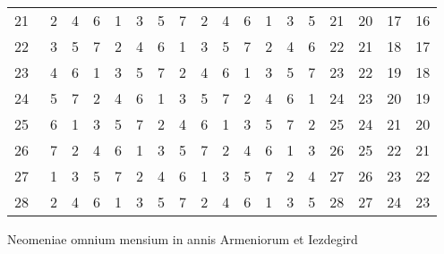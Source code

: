 \begin{tabnums}
\begin{tabular}[c]{@{} c  l l l l l l l l l l l l l  c c c c @{}}
21~  & 2 & 4 & 6 & 1 & 3 & 5 & 7 & 2 & 4 & 6 & 1 & 3 & 5 &  21 & 20 & 17 & 16 \\
22~  & 3 & 5 & 7 & 2 & 4 & 6 & 1 & 3 & 5 & 7 & 2 & 4 & 6 &  22 & 21 & 18 & 17 \\
23~  & 4 & 6 & 1 & 3 & 5 & 7 & 2 & 4 & 6 & 1 & 3 & 5 & 7 &  23 & 22 & 19 & 18 \\
24~  & 5 & 7 & 2 & 4 & 6 & 1 & 3 & 5 & 7 & 2 & 4 & 6 & 1 &  24 & 23 & 20 & 19 \\
25~  & 6 & 1 & 3 & 5 & 7 & 2 & 4 & 6 & 1 & 3 & 5 & 7 & 2 &  25 & 24 & 21 & 20 \\
26~  & 7 & 2 & 4 & 6 & 1 & 3 & 5 & 7 & 2 & 4 & 6 & 1 & 3 &  26 & 25 & 22 & 21 \\
27~  & 1 & 3 & 5 & 7 & 2 & 4 & 6 & 1 & 3 & 5 & 7 & 2 & 4 &  27 & 26 & 23 & 22 \\
28~  & 2 & 4 & 6 & 1 & 3 & 5 & 7 & 2 & 4 & 6 & 1 & 3 & 5 &  28 & 27 & 24 & 23 \\
%
\bottomrule
\end{tabular}
%
\caption{Neomeniae omnium mensium in annis Armeniorum et Iezdegird}
\label{tab:p216}
%
\end{tabnums}
